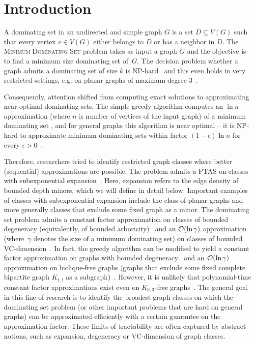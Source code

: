 
\section{Introduction}

A dominating set in an undirected and simple graph $G$ is a set
$D\subseteq V(G)$ such that every vertex $v\in V(G)$ either belongs
to $D$ or has a neighbor in $D$. The \textsc{Minimum Dominating Set} problem takes as input a graph $G$ and the objective
is to find a minimum size dominating set of~$G$. The decision
problem whether a graph admits a dominating set of size $k$
is NP-hard~\cite{karp1972reducibility} and this even holds in
very restricted settings, e.g. on planar graphs of maximum degree
$3$~\cite{garey1979computers}.

Consequently, attention
shifted from computing exact solutions to approxi\-mating
near optimal dominating sets. The simple greedy algorithm computes
an $\ln n$ approximation (where $n$ is number of vertices
of the input graph)
of a minimum dominating set \cite{johnson1974approximation,lovasz1975ratio}, and for
general graphs this algorithm is near optimal -- it is NP-hard
to approximate minimum dominating sets within factor
$(1-\epsilon)\ln n$ for every $\epsilon>0$~\cite{dinur2014analytical}.

Therefore, researchers tried to identify restricted
graph classes where better (sequential) approximations are possible. The problem
admits a PTAS on classes with sub\-exponential expansion~\cite{har2017approximation}. Here, expansion refers to the edge
density of bounded depth minors, which we will define in
detail below. Important examples of classes with subexponential
expansion include the class of planar graphs and more generally
classes that exclude some fixed graph as a minor. The dominating
set problem admits a constant factor approximation on classes of
bounded degeneracy (equivalently, of bounded arboricity)~\cite{bansal2017tight,lenzen2010minimum}
and an $\mathcal{O}(\ln \gamma)$ approxi\-mation (where~$\gamma$ denotes the size
of a minimum dominating set) on classes of bounded VC-dimension~\cite{bronnimann1995almost,even2005hitting}. In fact, the greedy
algorithm can be modified to yield a constant factor approximation on
graphs with bounded degeneracy~\cite{jones2017parameterized} and an $\mathcal{O}(\ln \gamma)$
approximation on biclique-free graphs (graphs that exclude some fixed
complete bipartite graph $K_{t,t}$ as a subgraph)~\cite{siebertz2019greedy}. However, it is unlikely
that polynomial-time constant factor approximations exist even on
$K_{3,3}$-free graphs~\cite{siebertz2019greedy}.
The general goal in this line of research is to identify the broadest
graph classes on which the dominating set problem (or other important
problems that are hard on general graphs) can be approximated
efficiently with a certain guarantee on the approximation factor.
These limits of tractability are often captured by abstract notions, such
as expansion, degeneracy or VC-dimension of graph classes.


